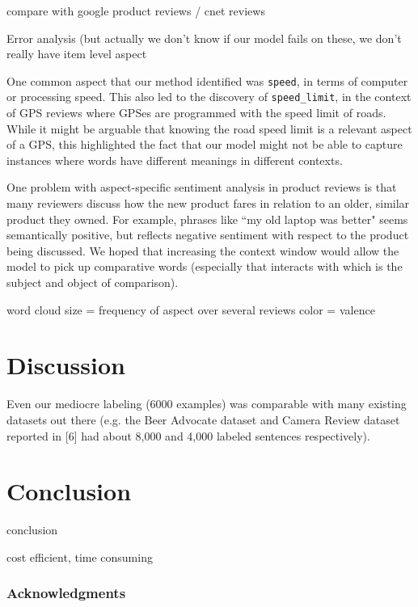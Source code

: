 \documentclass{article} %
\begin{document}
compare with google product reviews / cnet reviews

Error analysis (but actually we don't know if our model fails on these, we don't really have item level aspect

One common aspect that our method identified was \texttt{speed}, in terms of computer or processing speed. This also led to the discovery of \texttt{speed\_limit}, in the context of GPS reviews where GPSes are programmed with the speed limit of roads. While it might be arguable that knowing the road speed limit is a relevant aspect of a GPS, this highlighted the fact that our model might not be able to capture instances where words have different meanings in different contexts.

One problem with aspect-specific sentiment analysis in product reviews is that many reviewers discuss how the new product fares in relation to an older, similar product they owned. For example, phrases like ``my old laptop was better" seems semantically positive, but reflects negative sentiment with respect to the product being discussed. We hoped that increasing the context window would allow the model to pick up comparative words (especially that interacts with which is the subject and object of comparison).



word cloud
size = frequency of aspect over several reviews
color = valence

\section{Discussion}

Even our mediocre labeling (6000 examples) was comparable with many existing datasets out there (e.g. the Beer Advocate dataset and Camera Review dataset reported in [6] had about 8,000 and 4,000 labeled sentences respectively).

\section{Conclusion}

conclusion

cost efficient, time consuming






\subsubsection*{Acknowledgments}
\end{document}

